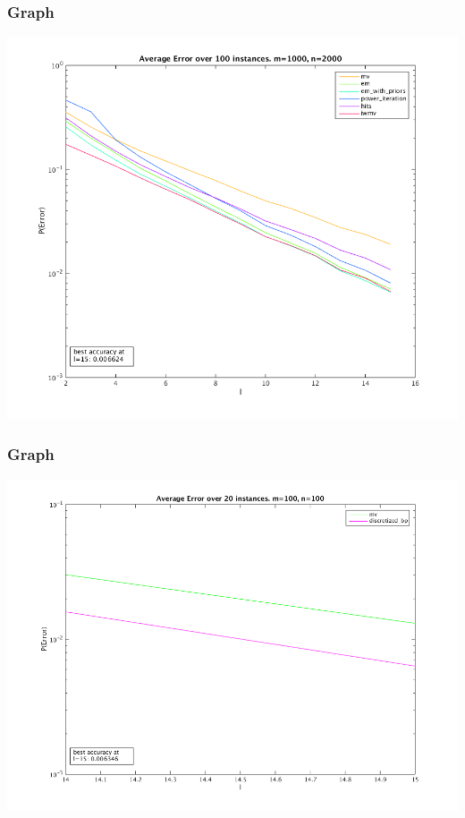 \documentclass[10pt, compress, onlymath]{beamer}
\begin{document}
\begin{frame}[fragile]
  \frametitle{Graph}

\centering
\includegraphics[scale=0.4]{all.png}


\end{frame}

\begin{frame}[fragile]
  \frametitle{Graph}

\centering
\includegraphics[scale=0.4]{mv_discretized.png}


\end{frame}
\end{document}
